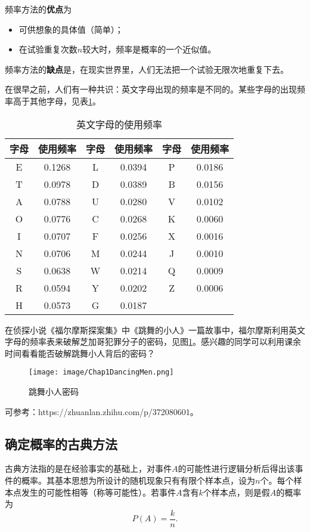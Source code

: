 频率方法的{\bf 优点}为
\begin{itemize}
    \item 可供想象的具体值（简单）；
    \item 在试验重复次数$n$较大时，频率是概率的一个近似值。
    \end{itemize}
频率方法的{\bf 缺点}是，在现实世界里，人们无法把一个试验无限次地重复下去。
\begin{example}
在很早之前，人们有一种共识：英文字母出现的频率是不同的。某些字母的出现频率高于其他字母，见表\ref{tab:chap01_character_frequency}。

\begin{table}[ht]
    \centering
    \caption{英文字母的使用频率}\label{tab:chap01_character_frequency}
    \begin{tabular}{cc cc cc}
    \hline
     字母   & 使用频率 &  字母   & 使用频率 & 字母   & 使用频率\\
     \hline
E & 0.1268 & L & 0.0394 & P & 0.0186\\
T & 0.0978 & D & 0.0389 & B & 0.0156\\
A & 0.0788 & U & 0.0280 & V & 0.0102\\
O & 0.0776 & C & 0.0268 & K & 0.0060\\
I & 0.0707 & F & 0.0256 & X & 0.0016\\
N & 0.0706 & M & 0.0244 & J & 0.0010\\
S & 0.0638 & W & 0.0214 & Q & 0.0009\\
R & 0.0594 & Y & 0.0202 & Z & 0.0006\\
H & 0.0573 & G & 0.0187 &   &       \\
     \hline
    \end{tabular}
    
\end{table}
在侦探小说《福尔摩斯探案集》中《跳舞的小人》一篇故事中，福尔摩斯利用英文字母的频率表来破解芝加哥犯罪分子的密码，见图\ref{fig:chap01_dancing_men}。感兴趣的同学可以利用课余时间看看能否破解跳舞小人背后的密码？

\begin{figure}
    \centering
\texttt{[image: image/Chap1DancingMen.png]}
    \caption{跳舞小人密码}
\label{fig:chap01_dancing_men}
\end{figure}



可参考：https://zhuanlan.zhihu.com/p/372080601。
\end{example}

\subsection{确定概率的古典方法}
古典方法指的是在经验事实的基础上，对事件$A$的可能性进行逻辑分析后得出该事件的概率。其基本思想为所设计的随机现象只有有限个样本点，设为$n$个。每个样本点发生的可能性相等（称等可能性）。若事件$A$含有$k$个样本点，则是假$A$的概率为
    $$
    P(A) = \frac{k}{n}.
    $$
    
